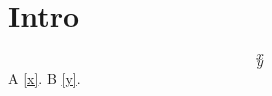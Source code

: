 \documentclass{article}
\begin{document}
\section{Intro}
\begin{equation}x\tag{$\star$}\label{x}\end{equation}
\begin{equation}y\tag{*}\label{y}\end{equation}
A \cref{x}. B \cref{y}.
\end{document}
